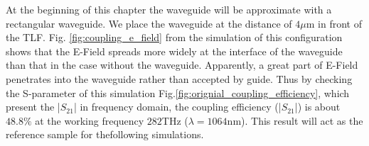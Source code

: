 At the beginning of this chapter the waveguide will be approximate with a rectangular waveguide. We place the waveguide at the distance of $4\mu$m in front of the TLF.  Fig. \ref{fig:coupling_e_field} from the simulation of this configuration shows that the E-Field spreads more widely at the interface of the waveguide than that in the case without the waveguide. Apparently, a great part of E-Field penetrates into the waveguide rather than accepted by guide. Thus by checking the S-parameter of this simulation Fig.\ref{fig:orignial_coupling_efficiency}, which present the |$S_{21}$| in frequency domain, the coupling efficiency (|$S_{21}$|) is about $48.8\%$ at the working frequency $282$THz ($\lambda=1064$nm). This result will act as the reference sample for thefollowing simulations.\\ 


